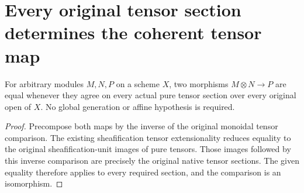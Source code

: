 \section{Every original tensor section determines the coherent tensor map}

\begin{lemma}
\label{lem:scheme-native-coherent-tensor-ext}
\leanok
For arbitrary modules $M,N,P$ on a scheme $X$, two morphisms
$M\otimes N\to P$ are equal whenever they agree on every actual pure
tensor section over every original open of $X$. No global generation
or affine hypothesis is required.
\end{lemma}
\begin{proof}
Precompose both maps by the inverse of the original monoidal tensor
comparison. The existing sheafification tensor extensionality reduces
equality to the original sheafification-unit images of pure tensors.
Those images followed by this inverse comparison are precisely the
original native tensor sections. The given equality therefore applies
to every required section, and the comparison is an isomorphism.
\end{proof}
